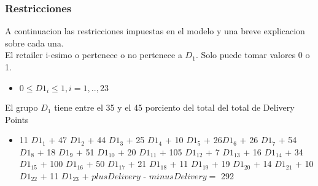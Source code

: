 \subsubsection{Restricciones}
A continuacion las restricciones impuestas en el modelo y una breve explicacion sobre cada una. \\
El retailer i-esimo o pertenece o no pertenece a $D_1$. Solo puede tomar valores 0 o 1. 
\begin{itemize}
\item $0 \leq {D1}_i \leq 1 ,  i = 1,..,23 $ \\
\end{itemize}
El grupo $D_1$ tiene entre el 35 y el 45 porciento del total del total de Delivery Points 
\begin{itemize}
\item 11 ${D1}_1$ + 47 ${D1}_2$ + 44 ${D1}_3$ + 25 ${D1}_4$ + 10 ${D1}_5$ + 26${D1}_6$ + 26 ${D1}_7$ + 54 ${D1}_8$ + 18 ${D1}_9$ + 51 ${D1}_{10}$ + 20 ${D1}_{11}$ + 105 ${D1}_{12}$ + 7 ${D1}_{13}$ + 16 ${D1}_{14}$ + 34 ${D1}_{15}$ + 100 ${D1}_{16}$ + 50 ${D1}_{17}$ + 21 ${D1}_{18}$ + 11 ${D1}_{19}$ + 19 ${D1}_{20}$ + 14 ${D1}_{21}$ + 10 ${D1}_{22}$ + 11 ${D1}_{23}$ + $plusDelivery$ - $minusDelivery = $ 292
\end{itemize}
